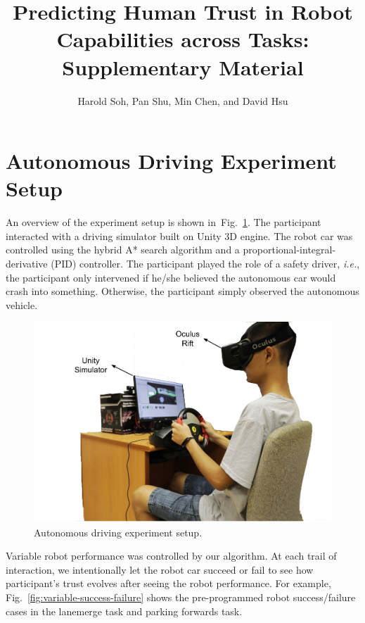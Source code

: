 \documentclass[11pt]{article}
\title{Predicting Human Trust in Robot Capabilities across Tasks: Supplementary Material}
\author{Harold Soh, Pan Shu, Min Chen, and David Hsu}
\newcommand{\ie}{\textit{i.e.}}
\newcommand{\figref}[1]{Fig.~\ref{#1}}
\begin{document}
\maketitle
\section{Autonomous Driving Experiment Setup}
\label{sec:driving-setup}

An overview of the experiment setup is shown in~\figref{fig:driving-task}. 
The participant interacted with a driving simulator 
built on Unity 3D engine. 
The robot car was controlled using the hybrid A* search algorithm and a proportional-integral-derivative (PID) controller.
The participant played the role of a safety driver, \ie, the participant only intervened if he/she believed the autonomous car would crash into something. Otherwise, the participant simply observed the autonomous vehicle.


\begin{figure}
    \centering
    \includegraphics[width=.9\columnwidth]{figs/driving-setup.pdf}
    \caption{Autonomous driving experiment setup.}
    \label{fig:driving-task}
\end{figure}


Variable robot performance was controlled by our algorithm. At each trail of interaction, we intentionally let the robot car succeed or fail to see how participant's trust evolves after seeing the robot performance. For example,
\figref{fig:variable-success-failure} shows the pre-programmed robot  success/failure cases in the lanemerge task and parking forwards task.
\end{document}
